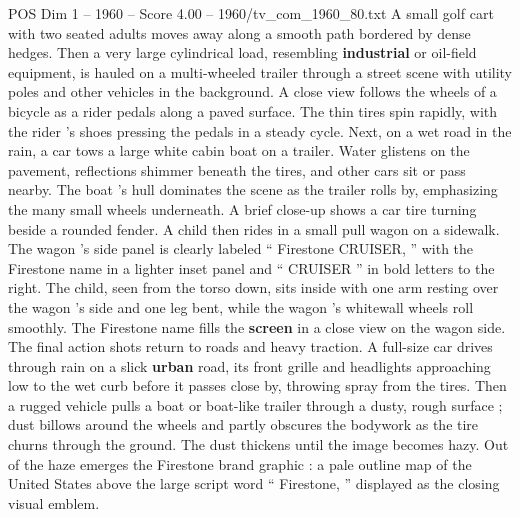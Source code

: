 \begin{textsample}{POS Dim 1 – 1960 – Score 4.00 – 1960/tv\_com\_1960\_80.txt}
A small golf cart with two seated adults moves away along a smooth path bordered by dense hedges.
Then a very large cylindrical load, resembling \textbf{industrial} or oil-field equipment, is hauled on a multi-wheeled trailer through a street scene with utility poles and other vehicles in the background.
A close view follows the wheels of a bicycle as a rider pedals along a paved surface.
The thin tires spin rapidly, with the rider ’s shoes pressing the pedals in a steady cycle.
Next, on a wet road in the rain, a car tows a large white cabin boat on a trailer.
Water glistens on the pavement, reflections shimmer beneath the tires, and other cars sit or pass nearby.
The boat ’s hull dominates the scene as the trailer rolls by, emphasizing the many small wheels underneath.
A brief close-up shows a car tire turning beside a rounded fender.
A child then rides in a small pull wagon on a sidewalk.
The wagon ’s side panel is clearly labeled “ Firestone CRUISER, ” with the Firestone name in a lighter inset panel and “ CRUISER ” in bold letters to the right.
The child, seen from the torso down, sits inside with one arm resting over the wagon ’s side and one leg bent, while the wagon ’s whitewall wheels roll smoothly.
The Firestone name fills the \textbf{screen} in a close view on the wagon side.
The final action shots return to roads and heavy traction.
A full-size car drives through rain on a slick \textbf{urban} road, its front grille and headlights approaching low to the wet curb before it passes close by, throwing spray from the tires.
Then a rugged vehicle pulls a boat or boat-like trailer through a dusty, rough surface ; dust billows around the wheels and partly obscures the bodywork as the tire churns through the ground.
The dust thickens until the image becomes hazy.
Out of the haze emerges the Firestone brand graphic : a pale outline map of the United States above the large script word “ Firestone, ” displayed as the closing visual emblem.

\end{textsample}
